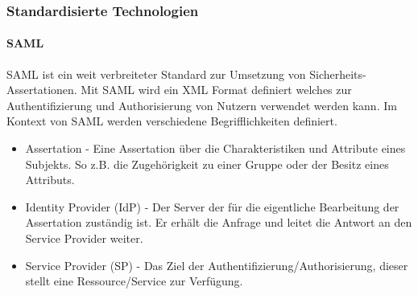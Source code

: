 \documentclass[12pt]{article}
\begin{document}
\subsubsection{Standardisierte Technologien}
\paragraph{SAML}
SAML ist ein weit verbreiteter Standard zur Umsetzung von Sicherheits-Assertationen. Mit SAML wird ein XML Format definiert welches zur Authentifizierung und Authorisierung von Nutzern verwendet werden kann. Im Kontext von SAML werden verschiedene Begrifflichkeiten definiert.~\cite{hughes2005security}
\begin{itemize}
  \item Assertation - Eine Assertation über die Charakteristiken und Attribute eines Subjekts. So z.B. die Zugehörigkeit zu einer Gruppe oder der Besitz eines Attributs.
  \item Identity Provider (IdP) - Der Server der für die eigentliche Bearbeitung der Assertation zuständig ist. Er erhält die Anfrage und leitet die Antwort an den Service Provider weiter.
  \item Service Provider (SP) - Das Ziel der Authentifizierung/Authorisierung, dieser stellt eine Ressource/Service zur Verfügung.
\end{itemize}
\end{document}
